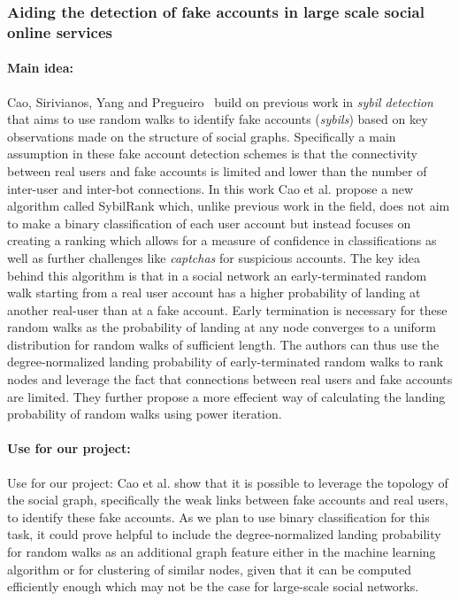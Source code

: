 \subsubsection{Aiding the detection of fake accounts in large scale social online services}

\paragraph{Main idea:}
Cao, Sirivianos, Yang and Pregueiro~\cite{cao2012aiding} build on previous work in \emph{sybil detection} that aims to use random walks to identify fake accounts (\emph{sybils}) based on key observations made on the structure of social graphs. Specifically a main assumption in these fake account detection schemes is that the connectivity between real users and fake accounts is limited and lower than the number of inter-user and inter-bot connections. In this work Cao et al. propose a new algorithm called SybilRank which, unlike previous work in the field, does not aim to make a binary classification of each user account but instead focuses on creating a ranking which allows for a measure of confidence in classifications as well as further challenges like \emph{captchas} for suspicious accounts. The key idea behind this algorithm is that in a social network an early-terminated random walk starting from a real user account has a higher probability of landing at another real-user than at a fake account. Early termination is necessary for these random walks as the probability of landing at any node converges to a uniform distribution for random walks of sufficient length. The authors can thus use the degree-normalized landing probability of early-terminated random walks to rank nodes and leverage the fact that connections between real users and fake accounts are limited. They further propose a more effecient way of calculating the landing probability of random walks using power iteration.


\paragraph{Use for our project:}
Use for our project: Cao et al. show that it is possible to leverage the topology of the social graph, specifically the weak links between fake accounts and real users, to identify these fake accounts. As we plan to use binary classification for this task, it could prove helpful to include the degree-normalized landing probability for random walks as an additional graph feature either in the machine learning algorithm or for clustering of similar nodes, given that it can be computed efficiently enough which may not be the case for large-scale social networks.

